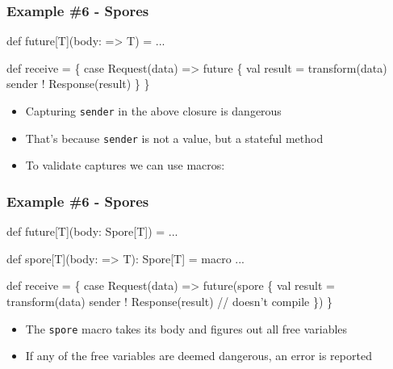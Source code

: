 \documentclass[svgnames,hyperref={bookmarks=false}]{beamer}
\begin{document}


\begin{frame}[fragile, t]
\frametitle{Example \#6 - Spores}

\begin{semiverbatim}
def future[T](body: => T) = ...

def receive = \{
  case Request(data) =>
    future \{
      val result = transform(data)
      sender ! Response(result)
    \}
\}

\end{semiverbatim}

\begin{itemize}
\item Capturing \texttt{sender} in the above closure is dangerous
\item That's because \texttt{sender} is not a value, but a stateful method
\item To validate captures we can use macros: 
\end{itemize}
\end{frame}

\begin{frame}[fragile, t]
\frametitle{Example \#6 - Spores}

\begin{semiverbatim}
def future[T](body: \alert{Spore[T]}) = ...

\alert{def spore[T](body: => T): Spore[T] = macro ...}

def receive = \{
  case Request(data) =>
    future(\alert{spore \{}
      val result = transform(data)
      sender ! Response(result) \alert{// doesn't compile}
    \alert{\}})
\}

\end{semiverbatim}

\begin{itemize}
\item The \texttt{spore} macro takes its body and figures out all free variables
\item If any of the free variables are deemed dangerous, an error is reported
\end{itemize}
\end{frame}
\end{document}

